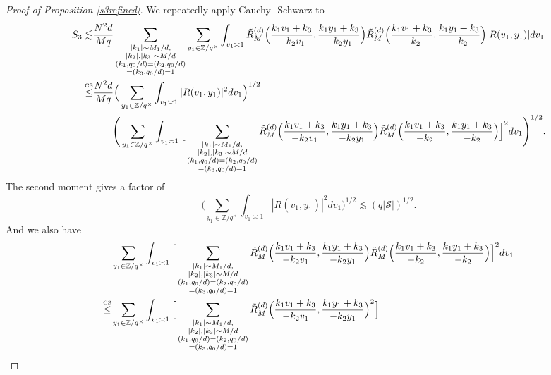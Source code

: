\begin{proof}[Proof of Proposition \ref{s3refined}]
We repeatedly apply Cauchy- Schwarz to \begin{align*}
    S_3\lesssim& \frac{N^2d}{Mq}
    \sum_{\substack{|k_1|\sim M_1/d,\\|k_2|,|k_3|\sim M/d\\
    (k_1,q_0/d)=(k_2,q_0/d)\\=(k_3,q_0/d)=1}} \sum_{y_1\in \mathbb{Z}/q^\times} \int_{v_1\asymp 1}
    \tilde{R}_M^{(d)}\Big(\frac{k_1v_1+k_3}{-k_2v_1},\frac{k_1y_1+k_3}{-k_2y_1}\Big)\tilde{R}_M^{(d)}\Big(\frac{k_1v_1+k_3}{-k_2},\frac{k_1y_1+k_3}{-k_2}\Big) |R(v_1,y_1)|dv_1\\
    \stackon{CS}{\leq}&
    \frac{N^2d}{Mq} \Big(\sum_{y_1\in \mathbb{Z}/q^\times} \int_{v_1\asymp 1}|R(v_1,y_1)|^2 dv_1\Big)^{1/2}\\
    & \quad \quad
    \Bigg(
    \sum_{y_1\in \mathbb{Z}/q^\times} \int_{v_1\asymp 1} \Big[
    \sum_{\substack{|k_1|\sim M_1/d,\\|k_2|,|k_3|\sim M/d\\
    (k_1,q_0/d)=(k_2,q_0/d)\\=(k_3,q_0/d)=1}}
    \tilde{R}_M^{(d)}\Big(\frac{k_1v_1+k_3}{-k_2v_1},\frac{k_1y_1+k_3}{-k_2y_1}\Big)\tilde{R}_M^{(d)}\Big(\frac{k_1v_1+k_3}{-k_2},\frac{k_1y_1+k_3}{-k_2}\Big)\Big] ^2 dv_1\Bigg)^{1/2}.\\
\end{align*}
The second moment gives a factor of \[
    \Big(\sum_{y_1\in \mathbb{Z}/q^\times} \int_{v_1\asymp 1}|R(v_1,y_1)|^2 dv_1\Big)^{1/2} \lesssim (q|\mathcal{S}|)^{1/2}.
\]
And we also have \begin{align*}
    &\sum_{y_1\in \mathbb{Z}/q^\times} \int_{v_1\asymp 1} \Big[
    \sum_{\substack{|k_1|\sim M_1/d,\\|k_2|,|k_3|\sim M/d\\
    (k_1,q_0/d)=(k_2,q_0/d)\\=(k_3,q_0/d)=1}}
    \tilde{R}_M^{(d)}\Big(\frac{k_1v_1+k_3}{-k_2v_1},\frac{k_1y_1+k_3}{-k_2y_1}\Big)\tilde{R}_M^{(d)}\Big(\frac{k_1v_1+k_3}{-k_2},\frac{k_1y_1+k_3}{-k_2}\Big)\Big] ^2 dv_1\\
    \stackon{CS}{\leq} &
    \sum_{y_1\in \mathbb{Z}/q^\times} \int_{v_1\asymp 1} 
    \Big[\sum_{\substack{|k_1|\sim M_1/d,\\|k_2|,|k_3|\sim M/d\\
        (k_1,q_0/d)=(k_2,q_0/d)\\=(k_3,q_0/d)=1}}
        \tilde{R}_M^{(d)}\Big(\frac{k_1v_1+k_3}{-k_2v_1},\frac{k_1y_1+k_3}{-k_2y_1}\Big)^2\Big]

\end{align*}
\end{proof}
